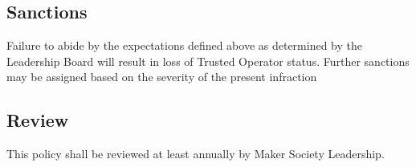 \documentclass[12pt,letterpaper]{article}
\begin{document}
\subsection{Sanctions}
Failure to abide by the expectations defined above as determined by the Leadership Board will result in loss of Trusted Operator status.
Further sanctions may be assigned based on the severity of the present infraction
\subsection{Review}
This policy shall be reviewed at least annually by Maker Society Leadership.
    
\end{document}
